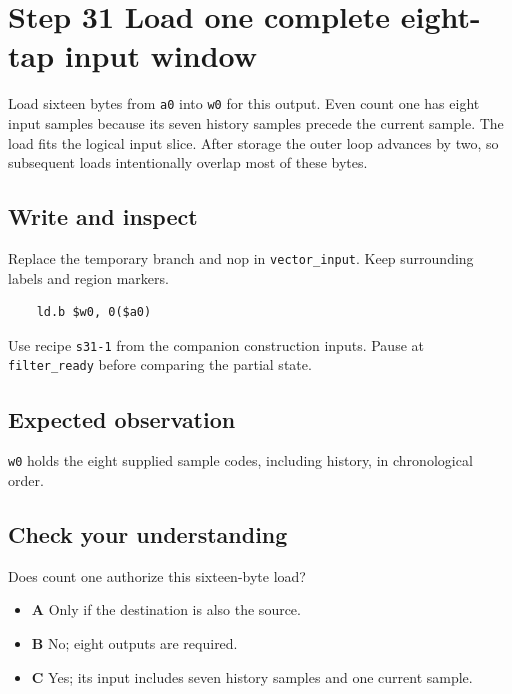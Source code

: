 \section{Step 31 Load one complete eight-tap input window}\label{fir-s31}

Load sixteen bytes from \texttt{a0} into \texttt{w0} for this output. Even count one has eight input samples because its seven history samples precede the current sample. The load fits the logical input slice. After storage the outer loop advances by two, so subsequent loads intentionally overlap most of these bytes.

\subsection{Write and inspect}
Replace the temporary branch and nop in \texttt{vector\_input}. Keep surrounding labels and region markers.

\begin{verbatim}
    ld.b $w0, 0($a0)
\end{verbatim}
Use recipe \texttt{s31-1} from the companion construction inputs. Pause at \texttt{filter\_ready} before comparing the partial state.

\subsection{Expected observation}
\texttt{w0} holds the eight supplied sample codes, including history, in chronological order.

\subsection{Check your understanding}
Does count one authorize this sixteen-byte load?

\begin{itemize}
  \item \textbf{A} Only if the destination is also the source.
  \item \textbf{B} No; eight outputs are required.
  \item \textbf{C} Yes; its input includes seven history samples and one current sample.
\end{itemize}
